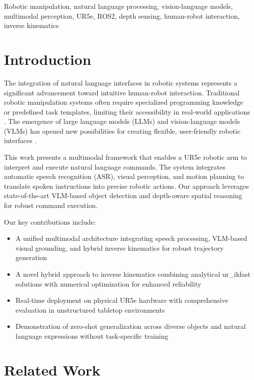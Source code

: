 \documentclass[conference]{IEEEtran}
\begin{document}
\begin{IEEEkeywords}
Robotic manipulation, natural language processing, vision-language models, multimodal perception, UR5e, ROS2, depth sensing, human-robot interaction, inverse kinematics
\end{IEEEkeywords}

\section{Introduction}
The integration of natural language interfaces in robotic systems represents a significant advancement toward intuitive human-robot interaction. Traditional robotic manipulation systems often require specialized programming knowledge or predefined task templates, limiting their accessibility in real-world applications \cite{billard2019trends}. The emergence of large language models (LLMs) and vision-language models (VLMs) has opened new possibilities for creating flexible, user-friendly robotic interfaces \cite{wang2024large}. 

This work presents a multimodal framework that enables a UR5e robotic arm to interpret and execute natural language commands. The system integrates automatic speech recognition (ASR), visual perception, and motion planning to translate spoken instructions into precise robotic actions. Our approach leverages state-of-the-art VLM-based object detection and depth-aware spatial reasoning for robust command execution.

Our key contributions include:
\begin{itemize}
    \item A unified multimodal architecture integrating speech processing, VLM-based visual grounding, and hybrid inverse kinematics for robust trajectory generation
    \item A novel hybrid approach to inverse kinematics combining analytical ur\_ikfast solutions with numerical optimization for enhanced reliability
    \item Real-time deployment on physical UR5e hardware with comprehensive evaluation in unstructured tabletop environments
    \item Demonstration of zero-shot generalization across diverse objects and natural language expressions without task-specific training
\end{itemize}

\section{Related Work}
\end{document}
